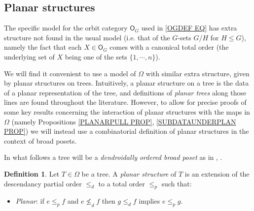 \documentclass[a4paper,10pt
,draft
]{article}%
\numberwithin{equation}{section}
\numberwithin{figure}{section}
\theoremstyle{definition} %
\newtheorem{definition}[equation]{Definition}%
\newcommand{\1}{\ensuremath{\mathbbm 1}}%
\begin{document}
\subsection{Planar structures}\label{PLASTR SEC}



The specific model for the orbit category $\mathsf{O}_G$
used in \eqref{OGDEF EQ} has extra structure not found in the usual model (i.e. that of the $G$-sets $G/H$ for $H \leq G$),
namely the fact that each $X \in \mathsf{O}_G$
comes with a canonical total order 
(the underlying set of $X$ being one of the sets $\{1,\cdots,n\}$).

We will find it convenient to use a model of $\Omega$ with similar extra structure, given by planar structures on trees.
Intuitively, a planar structure on a tree is the data of a planar representation of the tree, and 
definitions of \textit{planar trees} along those lines
are found throughout the literature.
However, to allow for precise proofs of some key results 
concerning the interaction of planar structures with the maps in $\Omega$ 
(namely Propositions \ref{PLANARPULL PROP},  \ref{SUBDATAUNDERPLAN PROP})
we will instead use a combinatorial definition 
of planar structures in the context of broad posets.

In what follows a tree will be a 
\textit{dendroidally ordered broad poset}
as in \cite{We12}, \cite[Def. 5.9]{Pe17}.


\begin{definition}\label{PLANARIZE DEF}
	Let $T \in \Omega$ be a tree. A \textit{planar structure} of $T$ is an extension of the descendancy partial order $\leq_d$ to a total order $\leq_p$ such that: 
	\begin{itemize}
		\item \textit{Planar}: if $e \leq_p f$ and $e \nleq_d f$ then 
		$g \leq_d f$ implies $e \leq_p g$.
	\end{itemize} 
\end{definition}
\end{document}
